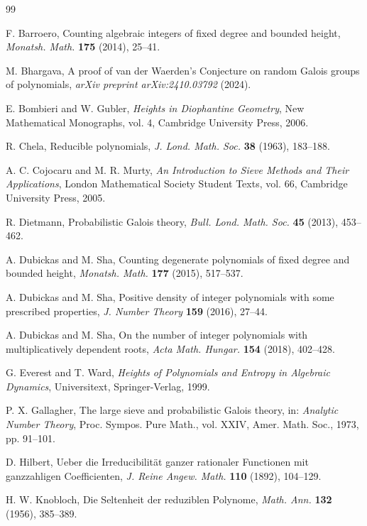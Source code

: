 \documentclass[11pt,a4paper]{article}
\begin{document}
\begin{thebibliography}{99}

 F. Barroero, Counting algebraic integers of fixed degree and bounded height, \textit{Monatsh. Math.} \textbf{175} (2014), 25--41.

 M. Bhargava, A proof of van der Waerden's Conjecture on random Galois groups of polynomials, \textit{arXiv preprint arXiv:2410.03792} (2024).

 E. Bombieri and W. Gubler, \textit{Heights in Diophantine Geometry}, New Mathematical Monographs, vol. 4, Cambridge University Press, 2006.

 R. Chela, Reducible polynomials, \textit{J. Lond. Math. Soc.} \textbf{38} (1963), 183--188.

 A. C. Cojocaru and M. R. Murty, \textit{An Introduction to Sieve Methods and Their Applications}, London Mathematical Society Student Texts, vol. 66, Cambridge University Press, 2005.

 R. Dietmann, Probabilistic Galois theory, \textit{Bull. Lond. Math. Soc.} \textbf{45} (2013), 453--462.

 A. Dubickas and M. Sha, Counting degenerate polynomials of fixed degree and bounded height, \textit{Monatsh. Math.} \textbf{177} (2015), 517--537.

 A. Dubickas and M. Sha, Positive density of integer polynomials with some prescribed properties, \textit{J. Number Theory} \textbf{159} (2016), 27--44.

 A. Dubickas and M. Sha, On the number of integer polynomials with multiplicatively dependent roots, \textit{Acta Math. Hungar.} \textbf{154} (2018), 402--428.

 G. Everest and T. Ward, \textit{Heights of Polynomials and Entropy in Algebraic Dynamics}, Universitext, Springer-Verlag, 1999.

 P. X. Gallagher, The large sieve and probabilistic Galois theory, in: \textit{Analytic Number Theory}, Proc. Sympos. Pure Math., vol. XXIV, Amer. Math. Soc., 1973, pp. 91--101.

 D. Hilbert, Ueber die Irreducibilität ganzer rationaler Functionen mit ganzzahligen Coefficienten, \textit{J. Reine Angew. Math.} \textbf{110} (1892), 104--129.

 H. W. Knobloch, Die Seltenheit der reduziblen Polynome, \textit{Math. Ann.} \textbf{132} (1956), 385--389.


\end{thebibliography}
\end{document}
